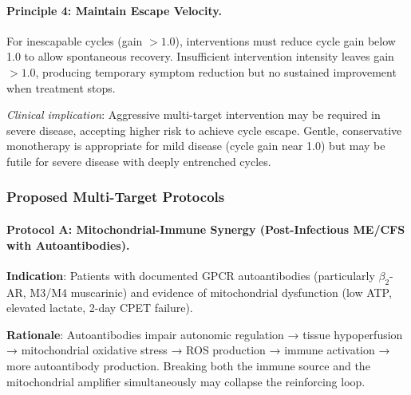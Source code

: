 \paragraph{Principle 4: Maintain Escape Velocity.}

For inescapable cycles (gain $>1.0$), interventions must reduce cycle gain below 1.0 to allow spontaneous recovery. Insufficient intervention intensity leaves gain $>1.0$, producing temporary symptom reduction but no sustained improvement when treatment stops.

\textit{Clinical implication}: Aggressive multi-target intervention may be required in severe disease, accepting higher risk to achieve cycle escape. Gentle, conservative monotherapy is appropriate for mild disease (cycle gain near 1.0) but may be futile for severe disease with deeply entrenched cycles.

\subsubsection{Proposed Multi-Target Protocols}

\paragraph{Protocol A: Mitochondrial-Immune Synergy (Post-Infectious ME/CFS with Autoantibodies).}

\textbf{Indication}: Patients with documented GPCR autoantibodies (particularly $\beta_2$-AR, M3/M4 muscarinic) and evidence of mitochondrial dysfunction (low ATP, elevated lactate, 2-day CPET failure).

\textbf{Rationale}: Autoantibodies impair autonomic regulation → tissue hypoperfusion → mitochondrial oxidative stress → ROS production → immune activation → more autoantibody production. Breaking both the immune source and the mitochondrial amplifier simultaneously may collapse the reinforcing loop.

